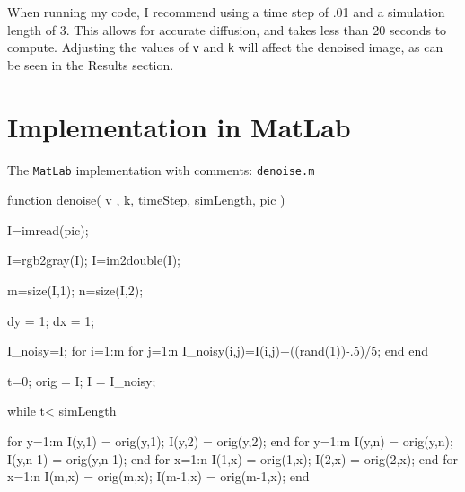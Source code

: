 \documentclass[12pt]{article}
\begin{document}
When running my code, I recommend using a time step of .01 and a simulation length of 3. This allows for accurate diffusion, and takes less than 20 seconds to compute. Adjusting the values of \texttt{v} and \texttt{k} will affect the denoised image, as can be seen in the Results section.


\clearpage


\appendix
\section{Implementation in MatLab}\label{sec::appendix}

The \texttt{MatLab} implementation with comments:\newline\newline
\texttt{denoise.m}
\begin{verbatimtab}
function denoise( v , k, timeStep, simLength, pic )

    I=imread(pic);%
    
    I=rgb2gray(I); %
    I=im2double(I); %

    m=size(I,1);
    n=size(I,2);
    
    dy = 1;
    dx = 1;

    I_noisy=I;
    for i=1:m
        for j=1:n
            I_noisy(i,j)=I(i,j)+((rand(1))-.5)/5;
        end
    end

    
    t=0;%
    orig = I;%
    I = I_noisy;%
    
    while t< simLength
        
        for y=1:m
            I(y,1) = orig(y,1);
            I(y,2) = orig(y,2);
        end
        for y=1:m
            I(y,n) = orig(y,n);
            I(y,n-1) = orig(y,n-1);
        end
        for x=1:n
            I(1,x) = orig(1,x);
            I(2,x) = orig(2,x);
        end
        for x=1:n
            I(m,x) = orig(m,x);
            I(m-1,x) = orig(m-1,x);
        end


\end{verbatimtab}
\end{document}
